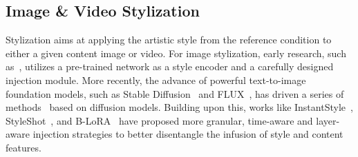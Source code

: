 \documentclass[runningheads]{llncs}
\begin{document}
\subsection{Image \& Video Stylization}
Stylization aims at applying the artistic style from the reference condition to either a given content image or video. For image stylization, early research, such as~\cite{adain,gao2018reconet}, utilizes a pre-trained network as a style encoder and a carefully designed injection module. More recently, the advance of powerful text-to-image foundation models, such as Stable Diffusion~\cite{sd} and FLUX~\cite{flux}, has driven a series of methods~\cite{ipadapter,deadiff} based on diffusion models. Building upon this, works like InstantStyle~\cite{instantstyle}, StyleShot~\cite{gao2025styleshot}, and B-LoRA~\cite{b-lora} have proposed more granular, time-aware and layer-aware injection strategies to better disentangle the infusion of style and content features.
\end{document}
